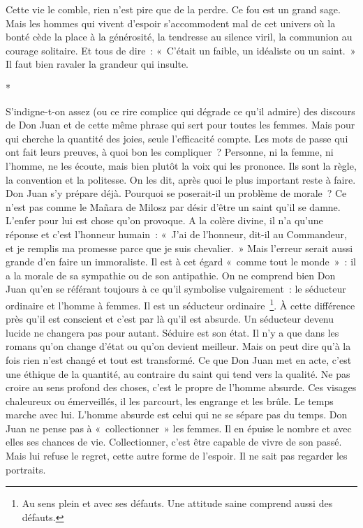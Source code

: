 \documentclass{book}
\begin{document}
Cette vie le comble, rien n'est pire que de la perdre. Ce fou est un grand sage. Mais les hommes qui vivent d'espoir s'accommodent mal de cet univers où la bonté cède la place à la générosité, la tendresse au silence viril, la communion au courage solitaire. Et tous de dire : « C'était un faible, un idéaliste ou un saint. » Il faut bien ravaler la grandeur qui insulte.

\begin{center}
*
\end{center}

S'indigne-t-on assez (ou ce rire complice qui dégrade ce qu'il admire) des discours de Don Juan et de cette même phrase qui sert pour toutes les femmes. Mais pour qui cherche la quantité des joies, seule l'efficacité compte. Les mots de passe qui ont fait leurs preuves, à quoi bon les compliquer ? Personne, ni la femme, ni l'homme, ne les écoute, mais bien plutôt la voix qui les prononce. Ils sont la règle, la convention et la politesse. On les dit, après quoi le plus important reste à faire. Don Juan s'y prépare déjà. Pourquoi se poserait-il un problème de morale ? Ce n'est pas comme le Mañara de Milosz par désir d'être un saint qu'il se damne. L'enfer pour lui est chose qu'on provoque. A la colère divine, il n'a qu'une réponse et c'est l'honneur humain : « J'ai de l'honneur, dit-il au Commandeur, et je remplis ma promesse parce que je suis chevalier. » Mais l'erreur serait aussi grande d'en faire un immoraliste. Il est à cet égard « comme tout le monde » : il a la morale de sa sympathie ou de son antipathie. On ne comprend bien Don Juan qu'en se référant toujours à ce qu'il symbolise vulgairement : le séducteur ordinaire et l'homme à femmes. Il est un séducteur ordinaire \footnote{Au sens plein et avec ses défauts. Une attitude saine comprend aussi des défauts.}. À cette différence près qu'il est conscient et c'est par là qu'il est absurde. Un séducteur devenu lucide ne changera pas pour autant. Séduire est son état. Il n'y a que dans les romans qu'on change d'état ou qu'on devient meilleur. Mais on peut dire qu'à la fois rien n'est changé et tout est transformé. Ce que Don Juan met en acte, c'est une éthique de la quantité, au contraire du saint qui tend vers la qualité. Ne pas croire au sens profond des choses, c'est le propre de l'homme absurde. Ces visages chaleureux ou émerveillés, il les parcourt, les engrange et les brûle. Le temps marche avec lui. L'homme absurde est celui qui ne se sépare pas du temps. Don Juan ne pense pas à « collectionner » les femmes. Il en épuise le nombre et avec elles ses chances de vie. Collectionner, c'est être capable de vivre de son passé. Mais lui refuse le regret, cette autre forme de l'espoir. Il ne sait pas regarder les portraits.
\end{document}
